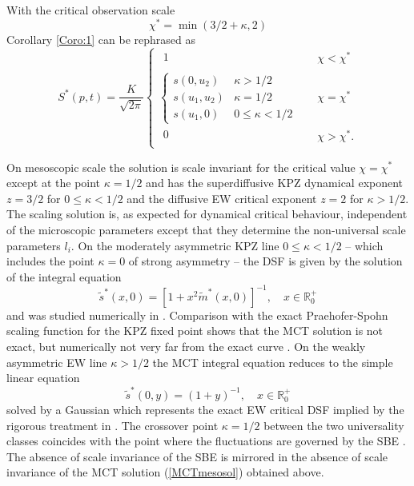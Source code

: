 \documentclass[12pt]{article}
\newcommand{\R}{{\mathbb R}}
\begin{document}
With the critical observation scale
\begin{equation}
\chi^\ast = \min{(3/2+\kappa,2)}
\label{critchi}
\end{equation}
Corollary \ref{Coro:1} can be 
rephrased as
\begin{equation}
S^\ast(p,t) = \frac{K}{\sqrt{2\pi}} \left\{
\begin{array}{ll}
\begin{array}{ll}
1 &  \\
\end{array}  & \quad \chi < \chi^\ast \\[2mm]
\left\{
\begin{array}{ll}
s(0,u_2) & \kappa > 1/2 \\
s(u_1,u_2) & \kappa = 1/2 \\
s(u_1,0) & 0 \leq \kappa < 1/2
\end{array} \right. & \quad \chi = \chi^\ast  \\[6mm]
\begin{array}{ll}
0 &  \\
\end{array}  & \quad \chi > \chi^\ast.
\end{array} \right. 
\label{MCTmesosol}
\end{equation}

On mesoscopic scale the solution is scale invariant for the critical value $\chi=\chi^\ast$ 
except at the point $\kappa=1/2$ and has the superdiffusive
KPZ dynamical exponent 
$z=3/2$ for $0\leq\kappa<1/2$ and the diffusive EW critical exponent 
$z=2$ for $\kappa>1/2$. The scaling solution is, as expected for
dynamical critical behaviour, independent of the microscopic
parameters except that they determine the non-universal scale
parameters $l_i$. On the moderately asymmetric 
KPZ line $0\leq\kappa<1/2$ -- which
includes the point $\kappa=0$ of strong asymmetry --
the DSF is given by the solution of the integral equation
\begin{equation}
\tilde{s}^{\ast} (x,0)
=  \left[1+ x^2 \tilde{m}^{\ast}(x,0) \right]^{-1}, 
\quad x \in \R_0^+
\label{MCTintKPZ}
\end{equation}
and was studied numerically in \cite{Frey96}. Comparison
with the exact Praehofer-Spohn scaling function for the KPZ fixed point 
shows that the MCT solution is not exact, but numerically not very far
from the exact curve \cite{Prae04}. 
On the weakly asymmetric EW line $\kappa>1/2$ the MCT
integral equation reduces to the simple linear equation
\begin{equation}
\tilde{s}^{\ast} (0,y)
=  \left(1+ y \right)^{-1}, 
\quad x \in \R_0^+
\label{MCTintEW}
\end{equation}
solved by a Gaussian which represents the exact EW
critical DSF implied by the rigorous treatment in \cite{Gonc12}.
The crossover point $\kappa=1/2$ 
between the two universality classes coincides with the point where
the fluctuations are governed by the SBE \cite{Gonc12}.
The absence of scale invariance of the SBE is mirrored in the
absence of scale invariance of the MCT solution 
(\ref{MCTmesosol}) obtained above. 
\end{document}
